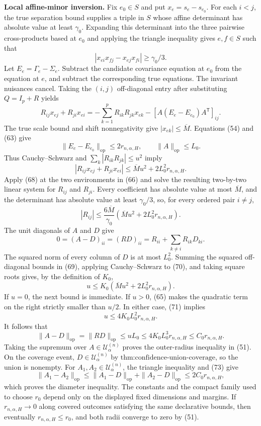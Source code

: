 \textbf{Local affine-minor inversion.}
Fix \(e_0\in S\) and put \(x_e=s_e-s_{e_0}\). For each \(i<j\), the true separation bound supplies a triple in \(S\) whose affine determinant has absolute value at least \(\gamma_0\). Expanding this determinant into the three pairwise cross-products based at \(e_0\) and applying the triangle inequality gives \(e,f\in S\) such that
\[
|x_{ei}x_{fj}-x_{ej}x_{fi}|\geq\gamma_0/3.
\tag{66}
\]
Let \(E_e=\Gamma_e-\Sigma_e\). Subtract the candidate covariance equation at \(e_0\) from the equation at \(e\), and subtract the corresponding true equations. The invariant nuisances cancel. Taking the \((i,j)\) off-diagonal entry after substituting \(Q=I_p+R\) yields
\[
R_{ij}x_{ej}+R_{ji}x_{ei}
=-\sum_{k=1}^pR_{ik}R_{jk}x_{ek}
-[A(E_e-E_{e_0})A^{\mathsf T}]_{ij}.
\tag{67}
\]
The true scale bound and shift nonnegativity give \(|x_{ek}|\leq\overline M\). Equations (54) and (63) give
\[
\|E_e-E_{e_0}\|_{\mathrm{op}}
\leq2r_{n,\alpha,H},
\qquad \|A\|_{\mathrm{op}}\leq L_0.
\]
Thus Cauchy--Schwarz and \(\sum_k|R_{ik}R_{jk}|\leq u^2\) imply
\[
|R_{ij}x_{ej}+R_{ji}x_{ei}|
\leq\overline M u^2+2L_0^2r_{n,\alpha,H}.
\tag{68}
\]
Apply (68) at the two environments in (66) and solve the resulting two-by-two linear system for \(R_{ij}\) and \(R_{ji}\). Every coefficient has absolute value at most \(\overline M\), and the determinant has absolute value at least \(\gamma_0/3\), so, for every ordered pair \(i\neq j\),
\[
|R_{ij}|
\leq\frac{6\overline M}{\gamma_0}
\left(\overline M u^2+2L_0^2r_{n,\alpha,H}\right).
\tag{69}
\]
The unit diagonals of \(A\) and \(D\) give
\[
0=(A-D)_{ii}=(RD)_{ii}
=R_{ii}+\sum_{k\neq i}R_{ik}D_{ki}.
\tag{70}
\]
The squared norm of every column of \(D\) is at most \(L_0^2\). Summing the squared off-diagonal bounds in (69), applying Cauchy--Schwarz to (70), and taking square roots gives, by the definition of \(K_0\),
\[
u\leq K_0\left(\overline M u^2+2L_0^2r_{n,\alpha,H}\right).
\tag{71}
\]
If \(u=0\), the next bound is immediate. If \(u>0\), (65) makes the quadratic term on the right strictly smaller than \(u/2\). In either case, (71) implies
\[
u\leq4K_0L_0^2r_{n,\alpha,H}.
\tag{72}
\]
It follows that
\[
\|A-D\|_{\mathrm{op}}
=\|RD\|_{\mathrm{op}}
\leq uL_0
\leq4K_0L_0^3r_{n,\alpha,H}
\leq C_0r_{n,\alpha,H}.
\tag{73}
\]
Taking the supremum over \(A\in\mathcal U^{(n)}_\alpha\) proves the outer-radius inequality in (51). On the coverage event, \(D\in\mathcal U^{(n)}_\alpha\) by \(\text{thm:confidence-union-coverage}\), so the union is nonempty. For \(A_1,A_2\in\mathcal U^{(n)}_\alpha\), the triangle inequality and (73) give
\[
\|A_1-A_2\|_{\mathrm{op}}
\leq\|A_1-D\|_{\mathrm{op}}+\|A_2-D\|_{\mathrm{op}}
\leq2C_0r_{n,\alpha,H},
\]
which proves the diameter inequality. The constants and the compact family used to choose \(r_0\) depend only on the displayed fixed dimensions and margins. If \(r_{n,\alpha,H}\to0\) along covered outcomes satisfying the same declarative bounds, then eventually \(r_{n,\alpha,H}\leq r_0\), and both radii converge to zero by (51).
